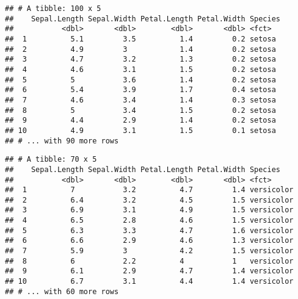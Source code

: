 \documentclass[]{book}
\newenvironment{Shaded}{\begin{snugshade}}{\end{snugshade}}
\newcommand{\KeywordTok}[1]{\textcolor[rgb]{0.13,0.29,0.53}{\textbf{#1}}}
\newcommand{\NormalTok}[1]{#1}
\newcommand{\OperatorTok}[1]{\textcolor[rgb]{0.81,0.36,0.00}{\textbf{#1}}}
\newcommand{\StringTok}[1]{\textcolor[rgb]{0.31,0.60,0.02}{#1}}
\begin{document}
\begin{verbatim}
## # A tibble: 100 x 5
##    Sepal.Length Sepal.Width Petal.Length Petal.Width Species
##           <dbl>       <dbl>        <dbl>       <dbl> <fct>  
##  1          5.1         3.5          1.4         0.2 setosa 
##  2          4.9         3            1.4         0.2 setosa 
##  3          4.7         3.2          1.3         0.2 setosa 
##  4          4.6         3.1          1.5         0.2 setosa 
##  5          5           3.6          1.4         0.2 setosa 
##  6          5.4         3.9          1.7         0.4 setosa 
##  7          4.6         3.4          1.4         0.3 setosa 
##  8          5           3.4          1.5         0.2 setosa 
##  9          4.4         2.9          1.4         0.2 setosa 
## 10          4.9         3.1          1.5         0.1 setosa 
## # ... with 90 more rows
\end{verbatim}

\begin{Shaded}
\end{Shaded}

\begin{verbatim}
## # A tibble: 70 x 5
##    Sepal.Length Sepal.Width Petal.Length Petal.Width Species   
##           <dbl>       <dbl>        <dbl>       <dbl> <fct>     
##  1          7           3.2          4.7         1.4 versicolor
##  2          6.4         3.2          4.5         1.5 versicolor
##  3          6.9         3.1          4.9         1.5 versicolor
##  4          6.5         2.8          4.6         1.5 versicolor
##  5          6.3         3.3          4.7         1.6 versicolor
##  6          6.6         2.9          4.6         1.3 versicolor
##  7          5.9         3            4.2         1.5 versicolor
##  8          6           2.2          4           1   versicolor
##  9          6.1         2.9          4.7         1.4 versicolor
## 10          6.7         3.1          4.4         1.4 versicolor
## # ... with 60 more rows
\end{verbatim}

\begin{Shaded}
\end{Shaded}
\end{document}
